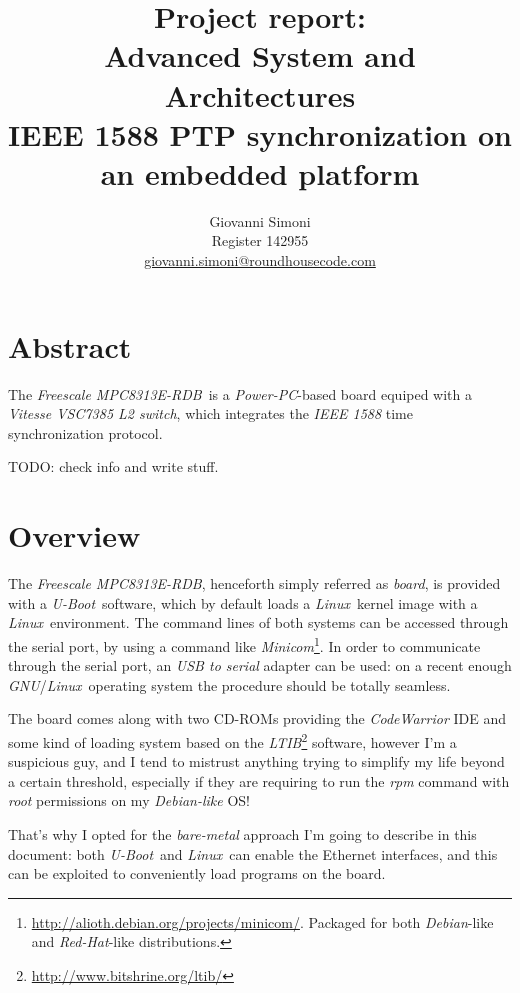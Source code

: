 \documentclass[10pt,a4paper]{article}
\title {
    Project report:\\
    Advanced System and Architectures\\
    IEEE 1588 PTP synchronization on an embedded platform
}
\author{
    Giovanni Simoni\\
    Register 142955\\
    \href{mailto:giovanni.simoni@roundhousecode.com}
         {giovanni.simoni@roundhousecode.com}
}
\newcommand{\TechName}[1]{\emph{{#1}}}
\newcommand{\StdName}[1]{\emph{{#1}}}
\newcommand{\MyBoard}{\TechName{Freescale MPC8313E-RDB}}
\newcommand{\PPC}{\TechName{Power-PC}}
\newcommand{\UBoot}{\TechName{U-Boot}}
\newcommand{\Linux}{\TechName{Linux}}
\newcommand{\GNULinux}{\TechName{GNU}/\Linux}
\newcommand{\BusyBox}{\TechName{Linux}}
\newcommand{\Minicom}{\TechName{Minicom}}
\newcommand{\LTIB}{\TechName{LTIB}}
\begin{document}
\maketitle

    \section*{ \center Abstract }

        The \MyBoard\ is a \PPC-based board equiped with a
        \TechName{Vitesse VSC7385 L2 switch}, which integrates the
        \StdName{IEEE 1588} time synchronization protocol.

        TODO: check info and write stuff.

    \newpage
    \tableofcontents

    \section{ Overview }

        The \MyBoard, henceforth simply referred as \emph{board}, is
        provided with a \UBoot\ software, which by default loads a \Linux\
        kernel image with a \BusyBox\ environment. The command lines of
        both systems can be accessed through the serial port, by using a
        command like \Minicom\footnote{
            \url{http://alioth.debian.org/projects/minicom/}. Packaged for
            both \emph{Debian}-like and \emph{Red-Hat}-like distributions.
        }. In order to communicate through the serial port, an \emph{USB
        to serial} adapter can be used: on a recent enough \GNULinux\
        operating system the procedure should be totally seamless.

        The board comes along with two CD-ROMs providing the
        \TechName{CodeWarrior} IDE and some kind of loading system based
        on the \LTIB\footnote{ \url{http://www.bitshrine.org/ltib/} }
        software, however I'm a suspicious guy, and I tend to mistrust
        anything trying to simplify my life beyond a certain threshold,
        especially if they are requiring to run the \emph{rpm} command
        with \emph{root} permissions on my \emph{Debian-like} OS!

        That's why I opted for the \emph{bare-metal} approach I'm going to
        describe in this document: both \UBoot\ and \Linux\ can enable the
        Ethernet interfaces, and this can be exploited to conveniently
        load programs on the board.
\end{document}
